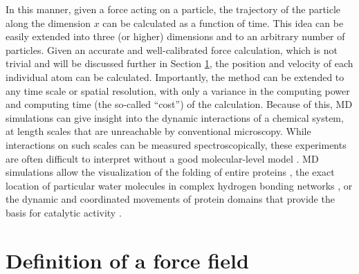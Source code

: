 In this manner, given a force acting on a particle, the trajectory of the particle along the dimension $x$ can be calculated as a function of time.
This idea can be easily extended into three (or higher) dimensions and to an arbitrary number of particles. 
Given an accurate and well-calibrated force calculation, which is not trivial and will be discussed further in Section \ref{intro-ff},
the position and velocity of each individual atom can be calculated. 
Importantly, the method can be extended to any time scale or spatial resolution, with only a variance in the computing power and computing time (the so-called ``cost'') of the calculation. 
Because of this, MD simulations can give insight into the dynamic interactions of a chemical system, at length scales that are unreachable by conventional microscopy.
While interactions on such scales can be measured spectroscopically, these experiments are often difficult to interpret without a good molecular-level model \cite{Reppert2016, Mukherjee2006, Ghosh2017}. 
MD simulations allow the visualization of the folding of entire proteins \cite{Cavalli2002, Piana2013}, the exact location of particular water molecules in complex hydrogen bonding networks \cite{ContiNibali2014, Jong2017}, or the dynamic and coordinated movements of protein domains that provide the basis for catalytic activity \cite{Zeng1999, Ma2000}. 

\section{Definition of a force field}\label{intro-ff}

